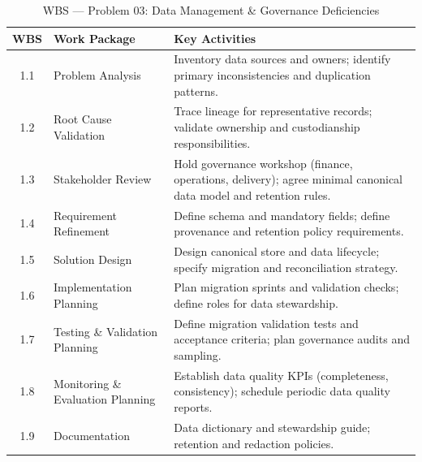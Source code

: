 \documentclass[12pt,a4paper]{report}
\begin{document}
\begin{table}[H]
\centering
\renewcommand{\arraystretch}{1.25}
\small
\begin{tabularx}{\textwidth}{|c|p{4.2cm}|X|}
\hline
\rowcolor{secondary}
\textbf{WBS} & \textbf{Work Package} & \textbf{Key Activities} \\
\hline
1.1 & Problem Analysis & Inventory data sources and owners; identify primary inconsistencies and duplication patterns. \\
\hline
1.2 & Root Cause Validation & Trace lineage for representative records; validate ownership and custodianship responsibilities. \\
\hline
1.3 & Stakeholder Review & Hold governance workshop (finance, operations, delivery); agree minimal canonical data model and retention rules. \\
\hline
1.4 & Requirement Refinement & Define schema and mandatory fields; define provenance and retention policy requirements. \\
\hline
1.5 & Solution Design & Design canonical store and data lifecycle; specify migration and reconciliation strategy. \\
\hline
1.6 & Implementation Planning & Plan migration sprints and validation checks; define roles for data stewardship. \\
\hline
1.7 & Testing \& Validation Planning & Define migration validation tests and acceptance criteria; plan governance audits and sampling. \\
\hline
1.8 & Monitoring \& Evaluation Planning & Establish data quality KPIs (completeness, consistency); schedule periodic data quality reports. \\
\hline
1.9 & Documentation & Data dictionary and stewardship guide; retention and redaction policies. \\
\hline
\end{tabularx}
\caption{WBS --- Problem 03: Data Management \& Governance Deficiencies}
\end{table}
\end{document}
